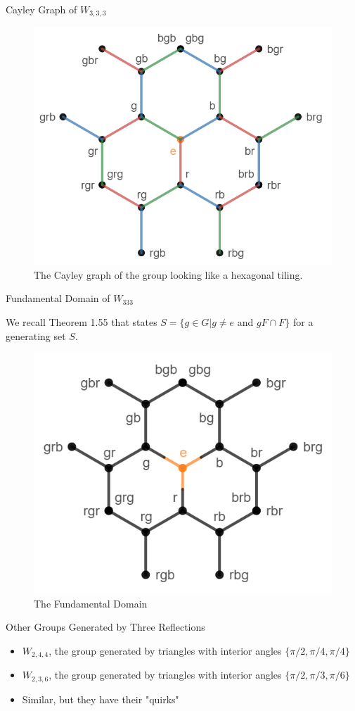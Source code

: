 \documentclass[usenames,dvipsnames]{beamer}
\begin{document}
\begin{frame}{Cayley Graph of $W_{3,3,3}$}
\begin{figure}[h]
    \centering
    \includegraphics[width=.6\textwidth]{images/6-06-rbg_rbg_3-cayley.png}
    \caption{The Cayley graph of the group looking like a hexagonal tiling.}
\end{figure}

\end{frame}

\begin{frame}{Fundamental Domain of $W_{333}$}

We recall Theorem 1.55 that states $S=\{g\in G | g \ne e$ and $gF \cap F\}$ for a generating set $S$.

\pause

\begin{figure}[h]
    \centering
    \includegraphics[width=.55\textwidth]{images/6-07-rbg_rbg_3-fundamental_domain.png}
    \caption{The Fundamental Domain}
\end{figure}

\end{frame}

\begin{frame}{Other Groups Generated by Three Reflections}

\begin{itemize}
  \item $W_{2,4,4}$, the group generated by triangles with interior angles $\{\pi/2,\pi/4,\pi/4\}$
  \item $W_{2,3,6}$, the group generated by triangles with interior angles $\{\pi/2,\pi/3,\pi/6\}$
  \item Similar, but they have their "quirks"
\end{itemize}

\end{frame}
\end{document}

